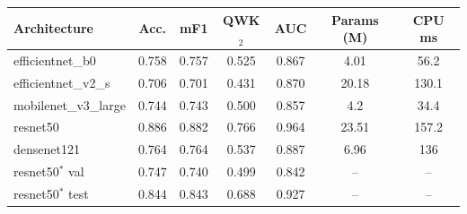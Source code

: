 \begin{tabular}{@{}lcccccc@{}}
\toprule
Architecture & Acc. & mF1 & QWK$_2$ & AUC & Params (M) & CPU ms\\
\midrule
efficientnet\_b0 & 0.758 & 0.757 & 0.525 & 0.867 & 4.01 & 56.2 \\
efficientnet\_v2\_s & 0.706 & 0.701 & 0.431 & 0.870 & 20.18 & 130.1 \\
mobilenet\_v3\_large & 0.744 & 0.743 & 0.500 & 0.857 & 4.2 & 34.4 \\
resnet50 & 0.886 & 0.882 & 0.766 & 0.964 & 23.51 & 157.2 \\
densenet121 & 0.764 & 0.764 & 0.537 & 0.887 & 6.96 & 136 \\
\midrule
resnet50$^\ast$ val & 0.747 & 0.740 & 0.499 & 0.842 & -- & -- \\
resnet50$^\ast$ test & 0.844 & 0.843 & 0.688 & 0.927 & -- & -- \\
\bottomrule
\end{tabular}
